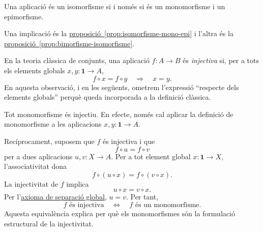 \begin{corollari}\label{cor:isomorfisme-bimorfisme}
Una aplicació és un isomorfisme si i només si és un monomorfisme i un epimorfisme.
\end{corollari}

\begin{prova}
Una implicació és la \hyperref[prop:isomorfisme-mono-epi]{proposició~\ref*{prop:isomorfisme-mono-epi}} i l'altra és la \hyperref[prop:bimorfisme-isomorfisme]{proposició~\ref*{prop:bimorfisme-isomorfisme}}.
\end{prova}

\begin{observacio}\label{obs:injectiva-mono}
En la teoria clàssica de conjunts, una aplicació \(f:A\to B\) és \emph{injectiva} si, per a tots els elements globals \(x,y:\mathbf1\to A\),
\[
f\circ x=f\circ y
\quad\Longrightarrow\quad
x=y.
\]
En aquesta observació, i en les següents, ometrem l'expressió \enquote{respecte dels elements globals} perquè queda incorporada a la definició clàssica.

Tot monomorfisme és injectiu. En efecte, només cal aplicar la definició de monomorfisme a les aplicacions \(x,y:\mathbf1\to A\).

Recíprocament, suposem que \(f\) és injectiva i que
\[
f\circ u=f\circ v
\]
per a dues aplicacions \(u,v:X\to A\). Per a tot element global \(x:\mathbf1\to X\), l'associativitat dona
\[
f\circ(u\circ x)=f\circ(v\circ x).
\]
La injectivitat de \(f\) implica
\[
u\circ x=v\circ x.
\]
Per l'\hyperref[ax:separacio-globals]{axioma de separació global}, \(u=v\). Per tant,
\[
\boxed{
 f\text{ és injectiva}
 \quad\Longleftrightarrow\quad
 f\text{ és un monomorfisme}.
}
\]
Aquesta equivalència explica per què els monomorfismes són la formulació estructural de la injectivitat.
\end{observacio}

